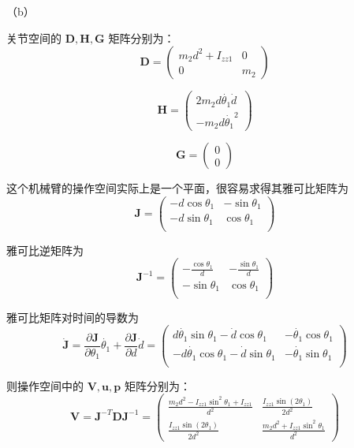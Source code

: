 \documentclass{homework}
\begin{document}
\begin{sol}
（b）

关节空间的 $ \mathbf{D}, \mathbf{H}, \mathbf{G} $ 矩阵分别为：
\[
  \mathbf{D} =
  \begin{pmatrix}
    m_2 d^2 + I_{zz1} & 0 \\
    0 & m_2
  \end{pmatrix}
\]

\[
  \mathbf{H} =
  \begin{pmatrix}
    2 m_2 d \dot{\theta_1} \dot{d} \\
    -m_2 d \dot{\theta_1}^2
  \end{pmatrix}
\]

\[
  \mathbf{G} =
  \begin{pmatrix}
    0 \\
    0
  \end{pmatrix}
\]

这个机械臂的操作空间实际上是一个平面，很容易求得其雅可比矩阵为
\[
  \mathbf{J} =
  \begin{pmatrix}
    -d \cos\theta_1 & -\sin\theta_1 \\
    -d \sin\theta_1 & \cos\theta_1 \\
  \end{pmatrix}
\]

雅可比逆矩阵为
\[
  \mathbf{J}^{-1} =
  \begin{pmatrix}
    -\frac{\cos\theta_1}{d} & -\frac{\sin\theta_1}{d} \\
    -\sin\theta_1 & \cos\theta_1 \\
  \end{pmatrix}
\]

雅可比矩阵对时间的导数为
\[
  \dot{\mathbf{J}} = \frac{\partial \mathbf{J}}{\partial \theta_1} \dot{\theta_1} + \frac{\partial \mathbf{J}}{\partial d} \dot{d} =
  \begin{pmatrix}
    d \dot{\theta_1} \sin\theta_1 - \dot{d} \cos\theta_1 & - \dot{\theta_1} \cos\theta_1 \\
    -d \dot{\theta_1} \cos\theta_1 - \dot{d} \sin\theta_1 & - \dot{\theta_1} \sin\theta_1 \\
  \end{pmatrix}
\]

则操作空间中的 $ \mathbf{V}, \mathbf{u}, \mathbf{p} $ 矩阵分别为：
\[
  \mathbf{V} = \mathbf{J}^{-T} \mathbf{D} \mathbf{J}^{-1} =
  \begin{pmatrix}
    \frac{m_2 d^2 - I_{zz1} \sin^2\theta_1 + I_{zz1}}{d^2} & \frac{I_{zz1} \sin(2\theta_1)}{2d^2} \\
    \frac{I_{zz1} \sin(2\theta_1)}{2d^2} & \frac{m_2 d^2 + I_{zz1} \sin^2\theta_1}{d^2}
  \end{pmatrix}
\]


\end{sol}
\end{document}
